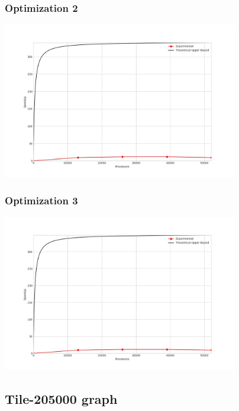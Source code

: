 \subsubsection{Optimization 2}
\begin{center}
    \resizebox{0.8\textwidth}{!}{}
    \includegraphics[width=0.77\textwidth]{../img/speedup-graph_type-tile-52000-O2}
\end{center}

\subsubsection{Optimization 3}
\begin{center}
    \resizebox{0.8\textwidth}{!}{}
    \includegraphics[width=0.77\textwidth]{../img/speedup-graph_type-tile-52000-O3}
\end{center}

\clearpage
\subsection{Tile-205000 graph}
